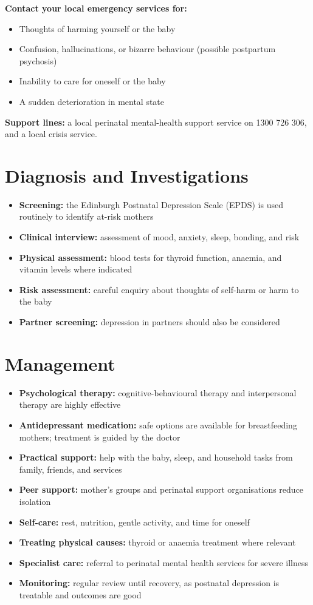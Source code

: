 \textbf{Contact your local emergency services for:}
\begin{itemize}
    \item Thoughts of harming yourself or the baby
    \item Confusion, hallucinations, or bizarre behaviour (possible postpartum psychosis)
    \item Inability to care for oneself or the baby
    \item A sudden deterioration in mental state
\end{itemize}
\textbf{Support lines:} a local perinatal mental-health support service on 1300 726 306, and a local crisis service.

\section*{Diagnosis and Investigations}
\begin{itemize}
    \item \textbf{Screening:} the Edinburgh Postnatal Depression Scale (EPDS) is used routinely to identify at-risk mothers
    \item \textbf{Clinical interview:} assessment of mood, anxiety, sleep, bonding, and risk
    \item \textbf{Physical assessment:} blood tests for thyroid function, anaemia, and vitamin levels where indicated
    \item \textbf{Risk assessment:} careful enquiry about thoughts of self-harm or harm to the baby
    \item \textbf{Partner screening:} depression in partners should also be considered
\end{itemize}

\section*{Management}
\begin{itemize}
    \item \textbf{Psychological therapy:} cognitive-behavioural therapy and interpersonal therapy are highly effective
    \item \textbf{Antidepressant medication:} safe options are available for breastfeeding mothers; treatment is guided by the doctor
    \item \textbf{Practical support:} help with the baby, sleep, and household tasks from family, friends, and services
    \item \textbf{Peer support:} mother's groups and perinatal support organisations reduce isolation
    \item \textbf{Self-care:} rest, nutrition, gentle activity, and time for oneself
    \item \textbf{Treating physical causes:} thyroid or anaemia treatment where relevant
    \item \textbf{Specialist care:} referral to perinatal mental health services for severe illness
    \item \textbf{Monitoring:} regular review until recovery, as postnatal depression is treatable and outcomes are good
\end{itemize}

